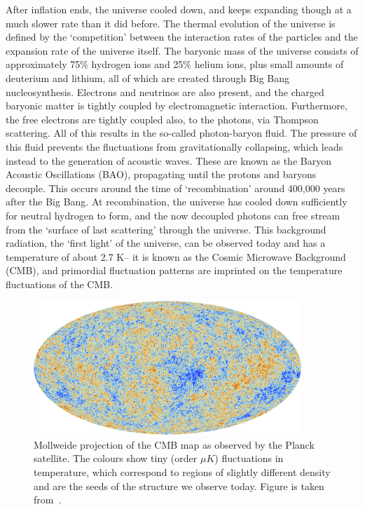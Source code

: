 After inflation ends, the universe cooled down, and keeps expanding though at a much slower rate than it did before. The thermal evolution of the universe is defined by the `competition' between the interaction rates of the particles and the expansion rate of the universe itself. The baryonic mass of the universe consists of approximately 75\% hydrogen ions and 25\% helium ions, plus small amounts of deuterium and lithium, all of which are created through Big Bang nucleosynthesis. Electrons and neutrinos are also present, and the charged baryonic matter is tightly coupled by electromagnetic interaction. Furthermore, the free electrons are tightly coupled also, to the photons, via Thompson scattering. All of this results in the so-called photon-baryon fluid. The pressure of this fluid prevents the fluctuations from gravitationally collapsing, which leads instead to the generation of acoustic waves. These are known as the Baryon Acoustic Oscillations (BAO), propagating until the protons and baryons decouple. This occurs around the time of `recombination' around 400,000 years after the Big Bang. At recombination, the universe has cooled down sufficiently for neutral hydrogen to form, and the now decoupled photons can free stream from the `surface of last scattering' through the universe. This background radiation, the `first light' of the universe, can be observed today and has a temperature of about 2.7 K-- it is known as the Cosmic Microwave Background (CMB), and primordial fluctuation patterns are imprinted on the temperature fluctuations of the CMB. 
\begin{figure}[!ht]
	\centering
	\includegraphics[width=0.9\textwidth]{fig/Planck_CMB.jpg}
	\caption{Mollweide projection of the CMB map as observed by the Planck satellite. The colours show tiny (order $\mu K$) fluctuations in temperature, which correspond to regions of slightly different density and are the seeds of the structure we observe today. Figure is taken from~\cite{ESA:2013cmb}.}
\end{figure}

